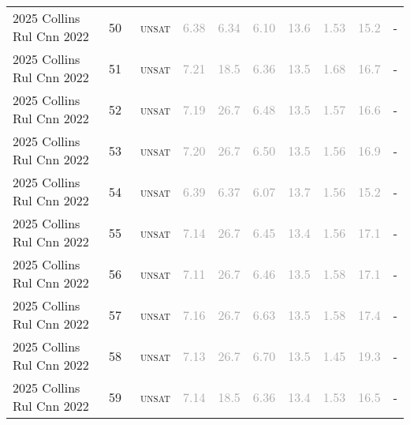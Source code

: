 \begin{center}
{\begin{longtable}{@{}llllllllll@{}}
2025 Collins Rul Cnn 2022 & 50 & ~\textsc{unsat} & \textcolor{darkgray}{6.38} & \textcolor{darkgray}{6.34} & \textcolor{darkgray}{6.10} & \textcolor{darkgray}{13.6} & \textcolor{darkgray}{1.53} & \textcolor{darkgray}{15.2} & - \\
2025 Collins Rul Cnn 2022 & 51 & ~\textsc{unsat} & \textcolor{darkgray}{7.21} & \textcolor{darkgray}{18.5} & \textcolor{darkgray}{6.36} & \textcolor{darkgray}{13.5} & \textcolor{darkgray}{1.68} & \textcolor{darkgray}{16.7} & - \\
2025 Collins Rul Cnn 2022 & 52 & ~\textsc{unsat} & \textcolor{darkgray}{7.19} & \textcolor{darkgray}{26.7} & \textcolor{darkgray}{6.48} & \textcolor{darkgray}{13.5} & \textcolor{darkgray}{1.57} & \textcolor{darkgray}{16.6} & - \\
2025 Collins Rul Cnn 2022 & 53 & ~\textsc{unsat} & \textcolor{darkgray}{7.20} & \textcolor{darkgray}{26.7} & \textcolor{darkgray}{6.50} & \textcolor{darkgray}{13.5} & \textcolor{darkgray}{1.56} & \textcolor{darkgray}{16.9} & - \\
2025 Collins Rul Cnn 2022 & 54 & ~\textsc{unsat} & \textcolor{darkgray}{6.39} & \textcolor{darkgray}{6.37} & \textcolor{darkgray}{6.07} & \textcolor{darkgray}{13.7} & \textcolor{darkgray}{1.56} & \textcolor{darkgray}{15.2} & - \\
2025 Collins Rul Cnn 2022 & 55 & ~\textsc{unsat} & \textcolor{darkgray}{7.14} & \textcolor{darkgray}{26.7} & \textcolor{darkgray}{6.45} & \textcolor{darkgray}{13.4} & \textcolor{darkgray}{1.56} & \textcolor{darkgray}{17.1} & - \\
2025 Collins Rul Cnn 2022 & 56 & ~\textsc{unsat} & \textcolor{darkgray}{7.11} & \textcolor{darkgray}{26.7} & \textcolor{darkgray}{6.46} & \textcolor{darkgray}{13.5} & \textcolor{darkgray}{1.58} & \textcolor{darkgray}{17.1} & - \\
2025 Collins Rul Cnn 2022 & 57 & ~\textsc{unsat} & \textcolor{darkgray}{7.16} & \textcolor{darkgray}{26.7} & \textcolor{darkgray}{6.63} & \textcolor{darkgray}{13.5} & \textcolor{darkgray}{1.58} & \textcolor{darkgray}{17.4} & - \\
2025 Collins Rul Cnn 2022 & 58 & ~\textsc{unsat} & \textcolor{darkgray}{7.13} & \textcolor{darkgray}{26.7} & \textcolor{darkgray}{6.70} & \textcolor{darkgray}{13.5} & \textcolor{darkgray}{1.45} & \textcolor{darkgray}{19.3} & - \\
2025 Collins Rul Cnn 2022 & 59 & ~\textsc{unsat} & \textcolor{darkgray}{7.14} & \textcolor{darkgray}{18.5} & \textcolor{darkgray}{6.36} & \textcolor{darkgray}{13.4} & \textcolor{darkgray}{1.53} & \textcolor{darkgray}{16.5} & - \\

\end{longtable}}
\end{center}
